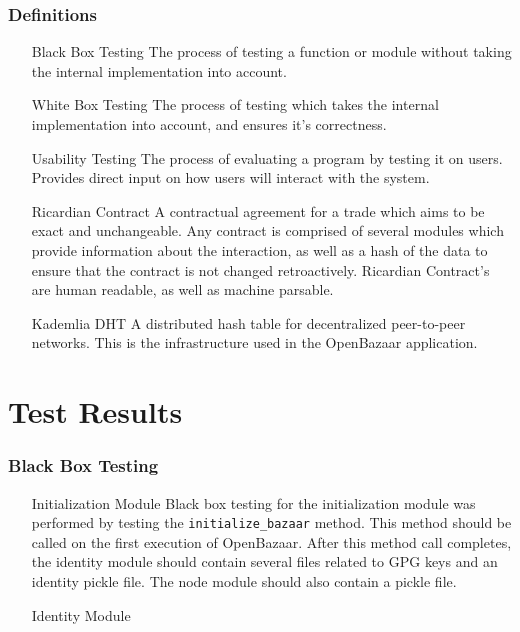 \documentclass{article}
\begin{document}
\section{Definitions}
\begin{itemize}
\item[Black Box Testing]
The process of testing a function or module without taking the internal implementation into account.

\item[White Box Testing]
The process of testing which takes the internal implementation into account, and ensures it's correctness.

\item[Usability Testing]
The process of evaluating a program by testing it on users. Provides direct input on how users will interact with the system.

\item[Ricardian Contract]
A contractual agreement for a trade which aims to be exact and unchangeable. Any contract is comprised of several modules which provide information about the interaction, as well as a hash of the data to ensure that the contract is not changed retroactively. Ricardian Contract's are human readable, as well as machine parsable. 

\item[Kademlia DHT]
A distributed hash table for decentralized peer-to-peer networks. This is the infrastructure used in the OpenBazaar application.
\end{itemize}

\part*{Test Results}
\section{Black Box Testing}
\begin{itemize}
\item[Initialization Module]
Black box testing for the initialization module was performed by testing the \texttt{initialize\_bazaar} method. This method should be called on the first execution of OpenBazaar. After this method call completes, the identity module should contain several files related to GPG keys and an identity pickle file. The node module should also contain a pickle file.

\item[Identity Module]

\end{itemize}
\end{document}
